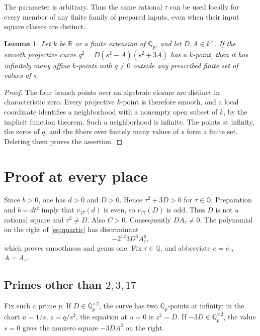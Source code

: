 \documentclass[11pt,a4paper]{article}
\newtheorem{lemma}[theorem]{Lemma}
\theoremstyle{definition}\newtheorem{definition}[theorem]{Definition}
\newcommand{\Q}{\mathbb Q}\newcommand{\F}{\mathbb F}
\begin{document}
The parameter is arbitrary. Thus the same rational $\tau$ can be used
locally for every member of any finite family of prepared inputs, even when
their input square classes are distinct.

\begin{lemma}\label{lem:open}
Let $k$ be $\mathbb R$ or a finite extension of $\Q_p$, and let $D,A\in
k^\times$. If the smooth projective curve
$q^2=D(s^2-A)(s^2+3A)$ has a $k$-point, then it has infinitely many affine
$k$-points with $q\ne0$ outside any prescribed finite set of values of $s$.
\end{lemma}
\begin{proof}
The four branch points over an algebraic closure are distinct in
characteristic zero. Every projective $k$-point is therefore smooth, and a
local coordinate identifies a neighborhood with a nonempty open subset of
$k$, by the implicit function theorem. Such a neighborhood is infinite.
The points at infinity, the zeros of $q$, and the fibers over finitely many
values of $s$ form a finite set. Deleting them proves the assertion.
\end{proof}

\section{Proof at every place}

Since $b>0$, one has $d>0$ and $D>0$. Hence $\tau^2+3D>0$ for
$\tau\in\Q$. Preparation and $b=dt^2$ imply that $v_{17}(d)$ is even,
so $v_{17}(D)$ is odd. Thus $D$ is not a rational square and
$\tau^2\ne D$. Also $C>0$. Consequently $D A_\tau\ne0$.
The polynomial on the right of \eqref{eq:quartic} has discriminant
\begin{equation}\label{eq:disc}
                         -2^{12}3D^6A_\tau^6,
\end{equation}
which proves smoothness and genus one. Fix $\tau\in\Q$, and abbreviate
$e=e_\tau$, $A=A_\tau$.

\subsection{Primes other than $2,3,17$}

Fix such a prime $p$. If $D\in\Q_p^{\times2}$, the curve has two
$\Q_p$-points at infinity: in the chart $u=1/s$, $z=q/s^2$, the
equation at $u=0$ is $z^2=D$. If $-3D\in\Q_p^{\times2}$,
the value $s=0$ gives the nonzero square $-3DA^2$ on the right.
\end{document}

